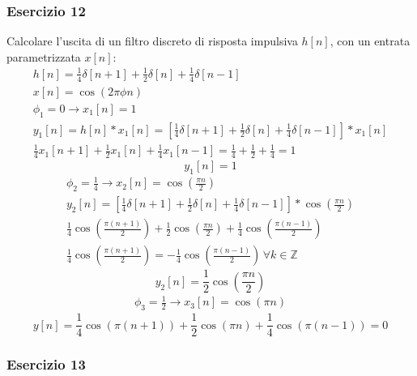 \documentclass{article}
\begin{document}
\subsubsection*{Esercizio 12}

Calcolare l'uscita di un filtro discreto di risposta impulsiva $h[n]$, con un entrata parametrizzata $x[n]$:
\begin{gather*}
    h[n]=\displaystyle\frac{1}{4}\delta[n+1]+\frac{1}{2}\delta[n]+\frac{1}{4}\delta[n-1]\\
    x[n]=\cos(2\pi\phi n)\\
    \phi_1=0\to x_1[n]=1\\
    y_1[n]=h[n]*x_1[n]=\displaystyle\left[\frac{1}{4}\delta[n+1]+\frac{1}{2}\delta[n]+\frac{1}{4}\delta[n-1]\right]*x_1[n]\\
    \displaystyle\frac{1}{4}x_1[n+1]+\frac{1}{2}x_1[n]+\frac{1}{4}x_1[n-1]=\frac{1}{4}+\frac{1}{2}+\frac{1}{4}=1
\end{gather*}
\begin{equation}
    y_1[n]=1
\end{equation}
\begin{gather*}
    \phi_2=\displaystyle\frac{1}{4}\to x_2[n]=\cos\left(\displaystyle\frac{\pi n}{2}\right)\\
    y_2[n]=\left[\displaystyle\frac{1}{4}\delta[n+1]+\frac{1}{2}\delta[n]+\frac{1}{4}\delta[n-1]\right]*\cos\left(\frac{\pi n}{2}\right)\\
    \displaystyle\frac{1}{4}\cos\left(\frac{\pi (n+1)}{2}\right)+\frac{1}{2}\cos\left(\frac{\pi n}{2}\right)+\frac{1}{4}\cos\left(\frac{\pi (n-1)}{2}\right)\\
    \displaystyle\frac{1}{4}\cos\left(\frac{\pi (n+1)}{2}\right)=-\frac{1}{4}\cos\left(\frac{\pi (n-1)}{2}\right)\,\forall k\in\mathbb{Z}
\end{gather*}
\begin{equation}
    y_2[n]=\displaystyle\frac{1}{2}\cos\left(\frac{\pi n}{2}\right)
\end{equation}
\begin{gather*}
    \phi_3=\displaystyle\frac{1}{2}\to x_3[n]=\cos\left(\displaystyle{\pi n}\right)
\end{gather*}
\begin{equation}
    y[n]=\displaystyle\frac{1}{4}\cos(\pi (n+1))+\frac{1}{2}\cos(\pi n)+\frac{1}{4}\cos(\pi(n-1))=0
\end{equation}

\subsubsection*{Esercizio 13}
\end{document}

